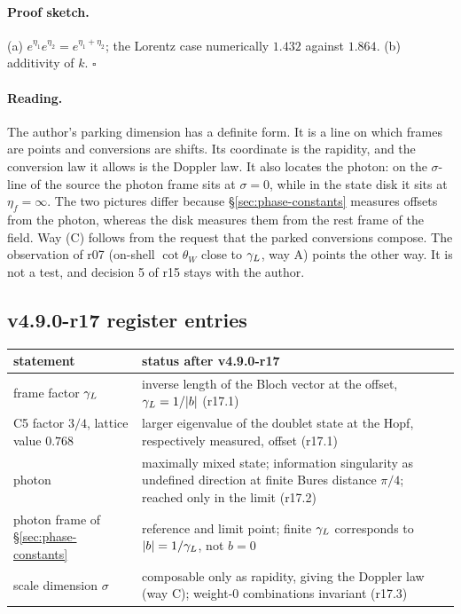 \paragraph{Proof sketch.}
(a) \(e^{\eta_1}e^{\eta_2}=e^{\eta_1+\eta_2}\); the Lorentz case numerically \(1.432\) against \(1.864\).  (b) additivity of \(k\).  \(\square\)

\paragraph{Reading.}
The author's parking dimension has a definite form.  It is a line on which frames are points and conversions are shifts.
Its coordinate is the rapidity, and the conversion law it allows is the Doppler law.  It also locates the photon: on the
\(\sigma\)-line of the source the photon frame sits at \(\sigma=0\), while in the state disk it sits at \(\eta_f=\infty\).  The two
pictures differ because \S\ref{sec:phase-constants} measures offsets from the photon, whereas the disk measures them from the
rest frame of the field.  Way (C) follows from the request that the parked conversions compose.  The observation of r07
(on-shell \(\cot\theta_W\) close to \(\gamma_L\), way A) points the other way.  It is not a test, and decision 5 of r15 stays with
the author.

\subsection*{v4.9.0-r17 register entries}
\label{subsec:v490-r17-register}

\begin{center}
\small
\begin{tabular}{@{}>{\raggedright\arraybackslash}p{}>{\raggedright\arraybackslash}p{}@{}}
\toprule
statement & status after v4.9.0-r17\\
\midrule
frame factor \(\gamma_L\) & inverse length of the Bloch vector at the offset, \(\gamma_L=1/|b|\) (r17.1)\\
C5 factor \(3/4\), lattice value \(0.768\) & larger eigenvalue of the doublet state at the Hopf, respectively measured, offset (r17.1)\\
photon & maximally mixed state; information singularity as undefined direction at finite Bures distance \(\pi/4\); reached only in the limit (r17.2)\\
photon frame of \S\ref{sec:phase-constants} & reference and limit point; finite \(\gamma_L\) corresponds to \(|b|=1/\gamma_L\), not \(b=0\)\\
scale dimension \(\sigma\) & composable only as rapidity, giving the Doppler law (way C); weight-0 combinations invariant (r17.3)\\
\bottomrule
\end{tabular}
\end{center}

